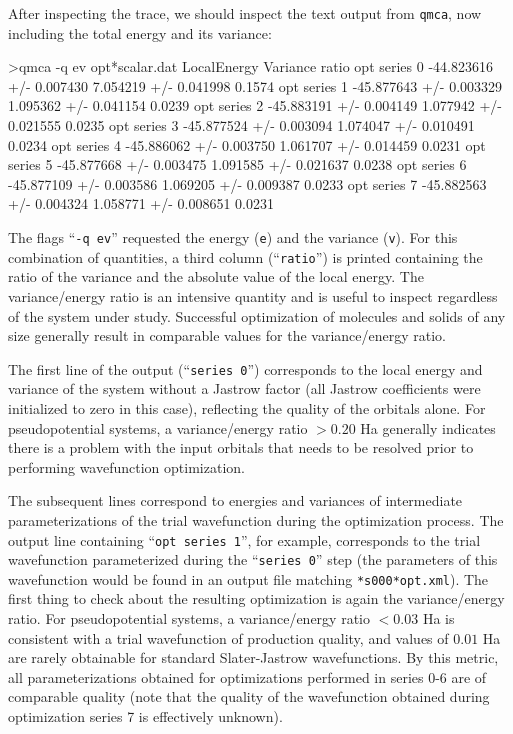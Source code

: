 After inspecting the trace, we should inspect the text output 
from \texttt{qmca}, now including the total energy and its variance:
\begin{shade}
>qmca -q ev opt*scalar.dat
                            LocalEnergy               Variance           ratio 
opt  series 0  -44.823616 +/- 0.007430   7.054219 +/- 0.041998   0.1574 
opt  series 1  -45.877643 +/- 0.003329   1.095362 +/- 0.041154   0.0239 
opt  series 2  -45.883191 +/- 0.004149   1.077942 +/- 0.021555   0.0235 
opt  series 3  -45.877524 +/- 0.003094   1.074047 +/- 0.010491   0.0234 
opt  series 4  -45.886062 +/- 0.003750   1.061707 +/- 0.014459   0.0231 
opt  series 5  -45.877668 +/- 0.003475   1.091585 +/- 0.021637   0.0238 
opt  series 6  -45.877109 +/- 0.003586   1.069205 +/- 0.009387   0.0233 
opt  series 7  -45.882563 +/- 0.004324   1.058771 +/- 0.008651   0.0231 
\end{shade}
\noindent
The flags ``\texttt{-q ev}'' requested the energy (\texttt{e}) and 
the variance (\texttt{v}).  For this combination of quantities, a 
third column (``\texttt{ratio}'') is printed containing the ratio 
of the variance and the absolute value of the local energy.
The variance/energy ratio is an intensive quantity and is useful  
to inspect regardless of the system under study.  Successful 
optimization of molecules and solids of any size generally result 
in comparable values for the variance/energy ratio. 

The first line of 
the output (``\texttt{series 0}'') corresponds to the local energy 
and variance of the system without a Jastrow factor (all Jastrow 
coefficients were initialized to zero in this case), reflecting the 
quality of the orbitals alone. For pseudopotential systems, a 
variance/energy ratio $>0.20$ Ha generally indicates there is a problem 
with the input orbitals that needs to be resolved prior to 
performing wavefunction optimization.  

The subsequent lines correspond to energies and variances of 
intermediate parameterizations of the trial wavefunction during 
the optimization process.  The output line containing 
``\texttt{opt  series 1}'', for example, corresponds to the trial 
wavefunction parameterized during the ``\texttt{series 0}'' step 
(the parameters of this wavefunction would be found in an output 
file matching \texttt{*s000*opt.xml}).  The first thing to check 
about the resulting optimization is again the variance/energy ratio. 
For pseudopotential systems, a variance/energy ratio $<0.03$ Ha is 
consistent with a trial wavefunction of production quality, and values 
of $0.01$ Ha are rarely obtainable for standard Slater-Jastrow 
wavefunctions.  By this metric, all parameterizations obtained for 
optimizations performed in series 0-6 are of comparable quality 
(note that the quality of the wavefunction obtained during optimization 
series 7 is effectively unknown).

